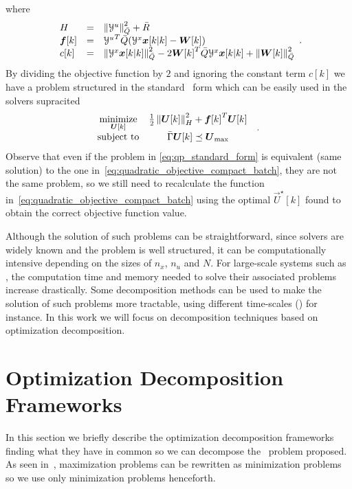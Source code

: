 \documentclass[../main.tex]{subfiles}
\begin{document}
where
\begin{equation}
\begin{array}{lll}
H&=&\left\lVert\mathcal{Y}^{u}\right\rVert^{2}_{\bar{Q}}+\bar{R}\\
\boldsymbol{f}[k]&=&{\mathcal{Y}^{u}}^{T}\bar{Q}(\mathcal{Y}^{x}\boldsymbol{x}[k|k]-\boldsymbol{W}[k])\\
c[k]&=&\left\lVert\mathcal{Y}^{x}\boldsymbol{x}[k|k]\right\rVert^{2}_{\bar{Q}}-2{\boldsymbol{W}[k]}^{T}\bar{Q}{\mathcal{Y}^{x}}\boldsymbol{x}[k|k]+\left\lVert\boldsymbol{W}[k]\right\rVert^{2}_{\bar{Q}}
\end{array}.
\end{equation}
By dividing the objective function by $2$ and ignoring the constant term $c[k]$ we have a problem structured in the standard \qp\ form which can be easily used in the solvers supracited
\begin{equation}
  \label{eq:qp_standard_form}
  \begin{aligned}
    \begin{matrix}
      \underset{\boldsymbol{U}[k]}{\mathrm{minimize}} &
      \frac{1}{2}\left\lVert\boldsymbol{U}[k]\right\rVert^{2}_{H} + {\boldsymbol{f}[k]}^{T}\boldsymbol{U}[k] &\\
      \mathrm{subject~ to} &
\bar{\Gamma}\boldsymbol{U}[k]\preceq {\boldsymbol{U}}_{\text{max}}
    \end{matrix}
  \end{aligned}.
\end{equation}
Observe that even if the problem in \eqref{eq:qp_standard_form} is equivalent (same solution) to the one in~\eqref{eq:quadratic_objective_compact_batch}, they are not the same problem, so we still need to recalculate the function in~\eqref{eq:quadratic_objective_compact_batch} using the optimal $\vec{U}^{\star}[k]$ found to obtain the correct objective function value.

Although the solution of such problems can be straightforward, since solvers are widely known and the problem is well structured, it can be computationally intensive depending on the sizes of $n_{x}$, $n_{u}$ and $N$.
For large-scale systems such as , the computation time and memory needed to solve their associated problems increase drastically.
Some decomposition methods can be used to make the solution of such problems more tractable, using different time-scales () for instance.
In this work we will focus on decomposition techniques based on optimization decomposition.

\section{Optimization Decomposition Frameworks}
\label{sec:decomp-fram}
In this section we briefly describe the optimization decomposition frameworks finding what they have in common so we can decompose the \mpc\ problem proposed.
As seen in~\cite{BoydVandenberghe2004}, maximization problems can be rewritten as minimization problems so we use only minimization problems henceforth.
\end{document}
